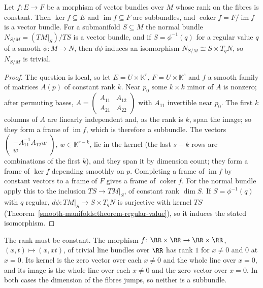 \begin{proposition}\label{vector-bundles:proposition-constant-rank}
Let $f \colon E \to F$ be a morphism of vector bundles over $M$ whose rank on the fibres is constant. Then $\ker f \subseteq E$ and $\operatorname{im}f \subseteq F$ are subbundles, and $\operatorname{coker}f = F/\operatorname{im}f$ is a vector
bundle. For a submanifold $S \subseteq M$ the normal bundle $N_{S/M} = (TM|_S)/TS$ is a vector bundle, and if $S = \phi^{-1}(q)$ for a regular value $q$ of a smooth $\phi \colon M \to N$, then $d\phi$ induces an isomorphism
$N_{S/M} \cong S \times T_qN$, so $N_{S/M}$ is trivial.
\end{proposition}

\begin{proof}
The question is local, so let $E = U \times \mathbb{K}^r$, $F = U \times \mathbb{K}^s$ and $f$ a smooth family of matrices $A(p)$ of constant rank $k$. Near $p_0$ some $k \times k$ minor of $A$ is nonzero; after permuting bases,
$A = \begin{pmatrix}A_{11} & A_{12}\\ A_{21} & A_{22}\end{pmatrix}$ with $A_{11}$ invertible near $p_0$. The first $k$ columns of $A$ are linearly independent and, as the rank is $k$, span the image; so they form a frame of $\operatorname{im}f$,
which is therefore a subbundle. The vectors $\begin{pmatrix}-A_{11}^{-1}A_{12}w\\ w\end{pmatrix}$, $w \in \mathbb{K}^{r-k}$, lie in the kernel (the last $s - k$ rows are combinations of the first $k$), and they span it by dimension count; they
form a frame of $\ker f$ depending smoothly on $p$. Completing a frame of $\operatorname{im}f$ by constant vectors to a frame of $F$ gives a frame of $\operatorname{coker}f$. For the normal bundle apply this to the inclusion
$TS \to TM|_S$, of constant rank $\dim S$. If $S = \phi^{-1}(q)$ with $q$ regular, $d\phi \colon TM|_S \to S \times T_qN$ is surjective with kernel $TS$ (Theorem~\ref{smooth-manifolds:theorem-regular-value}), so it induces the stated isomorphism.
\end{proof}

\begin{counterexample}\label{vector-bundles:counterexample-rank-jump}
The rank must be constant. The morphism $f \colon \RR \times \RR \to \RR \times \RR$, $(x, t) \mapsto (x, xt)$, of trivial line bundles over $\RR$ has rank $1$ for $x \neq 0$ and $0$ at
$x = 0$. Its kernel is the zero vector over each $x \neq 0$ and the whole line over $x = 0$, and its image is the whole line over each $x \neq 0$ and the zero vector over $x = 0$.
In both cases the dimension of the fibres jumps, so neither is a subbundle.
\end{counterexample}

